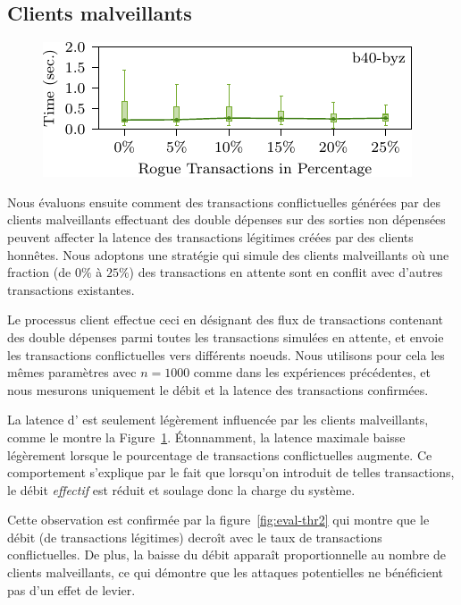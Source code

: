 \subsection{Clients malveillants}
\label{sec:evaluation-misbehaving}
\begin{figure}
\includegraphics[width=\linewidth]{figures/lat3.pdf}
\label{fig:eval-lat3}
\end{figure}

Nous évaluons ensuite comment des transactions conflictuelles générées par des clients malveillants effectuant des
double dépenses sur des sorties non dépensées peuvent affecter la latence des transactions légitimes créées par
des clients honnêtes. Nous adoptons une stratégie qui simule des clients malveillants où une fraction (de $0\%$ à $25\%$)
des transactions en attente sont en conflit avec d'autres transactions existantes.

Le processus client effectue ceci en désignant des flux de transactions contenant des double dépenses parmi toutes
les transactions simulées en attente, et envoie les transactions conflictuelles vers différents noeuds. Nous utilisons
pour cela les mêmes paramètres avec $n = 1000$ comme dans les expériences précédentes, et nous mesurons uniquement
le débit et la latence des transactions confirmées.

La latence d'{\sysname} est seulement légèrement influencée par les clients malveillants, comme le montre la
Figure~\ref{fig:eval-lat3}. Étonnamment, la latence maximale baisse légèrement lorsque le pourcentage de transactions
conflictuelles augmente. Ce comportement s'explique par le fait que lorsqu'on introduit de telles transactions, le débit
\emph{effectif} est réduit et soulage donc la charge du système.

Cette observation est confirmée par la figure~\ref{fig:eval-thr2} qui montre que le débit (de transactions légitimes)
decroît avec le taux de transactions conflictuelles. De plus, la baisse du débit apparaît proportionnelle au nombre de
clients malveillants, ce qui démontre que les attaques potentielles ne bénéficient pas d'un effet de levier.

